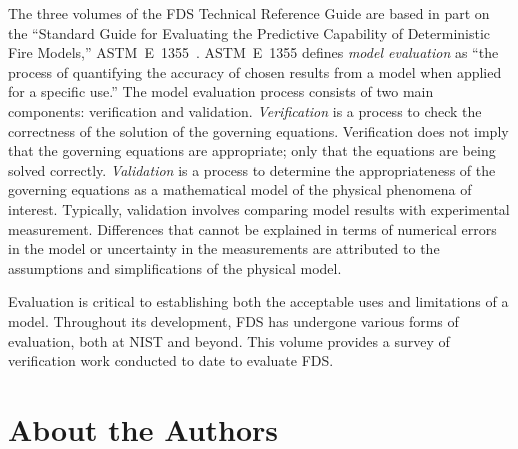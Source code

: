 \documentclass[11pt]{book}
\begin{document}
The three volumes of the FDS Technical Reference Guide are based in part on the ``Standard Guide for
Evaluating the Predictive Capability of Deterministic Fire Models,'' ASTM~E~1355~\cite{ASTM:E1355}.
ASTM~E~1355 defines {\em model evaluation} as ``the process of quantifying
the accuracy of chosen results from a model when applied for a specific use.''
The model evaluation process consists of two main components: verification and validation.
{\em Verification} is a process to check the correctness of the solution of the
governing equations. Verification does not imply that the governing equations are
appropriate; only that the equations are being solved correctly.
{\em Validation} is a process to determine the appropriateness of the governing equations as a mathematical
model of the physical phenomena of interest. Typically, validation involves comparing
model results with experimental measurement. Differences that cannot be explained in terms of
numerical errors in the model or uncertainty in the measurements
are attributed to the assumptions and simplifications of the physical model.

Evaluation is critical to establishing both the acceptable uses
and limitations of a model. Throughout its development, FDS has undergone various forms of evaluation,
both at NIST and beyond. This volume provides a survey of verification work conducted to date to evaluate FDS.



\chapter{About the Authors}
\end{document}
